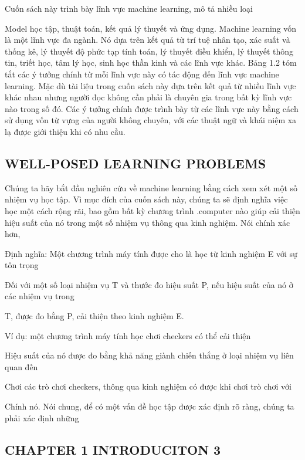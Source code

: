Cuốn sách này trình bày lĩnh vực machine learning, mô tả nhiều loại

Model học tập, thuật toán, kết quả lý thuyết và ứng dụng. Machine learning vốn là một lĩnh vực đa ngành. Nó dựa trên kết quả từ trí tuệ nhân tạo, xác suất và thống kê, lý thuyết độ phức tạp tính toán, lý thuyết điều khiển, lý thuyết thông tin, triết học, tâm lý học, sinh học thần kinh và các lĩnh vực khác. Bảng 1.2 tóm tắt các ý tưởng chính từ mỗi lĩnh vực này có tác động đến lĩnh vực machine learning. Mặc dù tài liệu trong cuốn sách này dựa trên kết quả từ nhiều lĩnh vực khác nhau nhưng người đọc không cần phải là chuyên gia trong bất kỳ lĩnh vực nào trong số đó. Các ý tưởng chính được trình bày từ các lĩnh vực này bằng cách sử dụng vốn từ vựng của người không chuyên, với các thuật ngữ và khái niệm xa lạ được giới thiệu khi có nhu cầu.

\subsection{WELL-POSED LEARNING PROBLEMS}

Chúng ta hãy bắt đầu nghiên cứu về machine learning bằng cách xem xét một số nhiệm vụ học tập. Vì mục đích của cuốn sách này, chúng ta sẽ định nghĩa việc học một cách rộng rãi, bao gồm bất kỳ chương trình .computer nào giúp cải thiện hiệu suất của nó trong một số nhiệm vụ thông qua kinh nghiệm. Nói chính xác hơn,

Định nghĩa: Một chương trình máy tính được cho là học từ kinh nghiệm E với sự tôn trọng

Đối với một số loại nhiệm vụ T và thước đo hiệu suất P, nếu hiệu suất của nó ở các nhiệm vụ trong

T, được đo bằng P, cải thiện theo kinh nghiệm E.

Ví dụ: một chương trình máy tính học chơi checkers có thể cải thiện

Hiệu suất của nó được đo bằng khả năng giành chiến thắng ở loại nhiệm vụ liên quan đến

Chơi các trò chơi checkers, thông qua kinh nghiệm có được khi chơi trò chơi với

Chính nó. Nói chung, để có một vấn đề học tập được xác định rõ ràng, chúng ta phải xác định những

\subsection{CHAPTER 1 INTRODUCITON 3}

